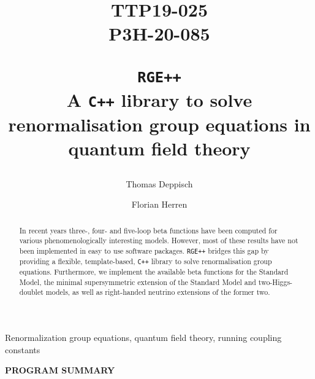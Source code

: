\documentclass[preprint,12pt]{elsarticle}
\begin{document}
\lstset{style=cpp}

\begin{frontmatter}
\title{\vskip-3cm{\baselineskip14pt
    \begin{flushleft}
      \normalsize TTP19-025\\ P3H-20-085
  \end{flushleft}}
  \vskip1.5cm
  \texttt{RGE++}\\ A \texttt{C++} library to solve renormalisation group equations in quantum field theory}

\author[a]{Thomas Deppisch}
\author[b]{Florian Herren}

\address[a]{German Weather Service (DWD)\\ Research and Development --- Data Assimilation\\ Frankfurter Stra\ss{}e 135, D-73067 Offenbach am Main, Germany}
\address[b]{Institut f\"ur Theoretische Teilchenphysik\\ Karlsruhe Institute of Technology (KIT)\\ Wolfgang-Gaede-Stra\ss{}e 1, D-76128 Karlsruhe, Germany}

\begin{abstract}
In recent years three-, four- and five-loop beta functions have been computed for various phenomenologically interesting models.
However, most of these results have not been implemented in easy to use software packages. \texttt{RGE++} bridges
this gap by providing a flexible, template-based, \texttt{C++} library to solve renormalisation group equations.
Furthermore, we implement the available beta functions for the Standard Model, the minimal supersymmetric
extension of the Standard Model and two-Higgs-doublet models, as well as right-handed neutrino extensions of the former two.
\end{abstract}
\begin{keyword}
Renormalization group equations, quantum field theory, running coupling constants
\end{keyword}
\end{frontmatter}
\newpage
{\bf PROGRAM SUMMARY}
\end{document}
